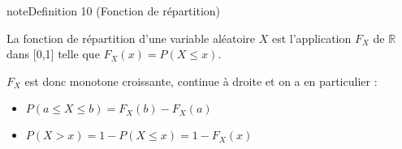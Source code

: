 \documentclass[letterpaper,10pt,french]{sphinxmanual}
\begin{document}
\ignorespaces \label{Rappels:definition-22}
\begin{sphinxadmonition}{note}{Definition 10 (Fonction de répartition)}



\sphinxAtStartPar
La fonction de répartition d’une variable aléatoire \(X\) est l’application \(F_X\) de \(\mathbb R\) dans {[}0,1{]} telle que \(F_X(x) = P(X\leq x)\).
\end{sphinxadmonition}

\sphinxAtStartPar
\(F_X\) est donc monotone croissante, continue à droite et on a en particulier :
\begin{itemize}
\item {} 
\sphinxAtStartPar
\(P(a\leq X\leq b) = F_X(b)-F_X(a)\)

\item {} 
\sphinxAtStartPar
\(P(X>x) = 1-P(X\leq x) = 1-F_X(x)\)

\end{itemize}
\end{document}
